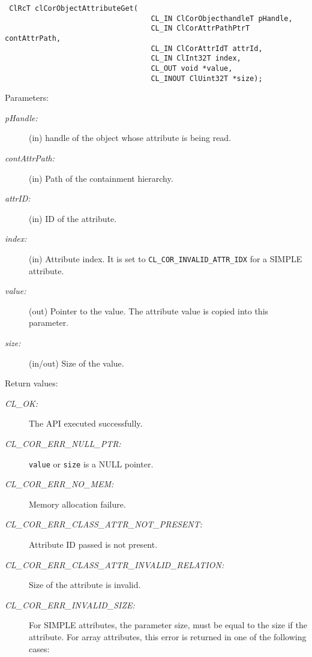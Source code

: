 \begin{flushleft}
\begin{Desc}
\footnotesize\begin{verbatim} ClRcT clCorObjectAttributeGet(
                                  CL_IN ClCorObjecthandleT pHandle,
                                  CL_IN ClCorAttrPathPtrT contAttrPath,
                                  CL_IN ClCorAttrIdT attrId,
                                  CL_IN ClInt32T index,
                                  CL_OUT void *value,
                                  CL_INOUT ClUint32T *size);
\end{verbatim}
\normalsize
\end{Desc}
\begin{Desc}
\item[Parameters:]
\begin{description}
\item[{\em p\-Handle:}](in) handle of the object whose attribute is being read. 
\item[{\em cont\-Attr\-Path:}](in) Path of the containment hierarchy. 
\item[{\em attr\-ID:}](in) ID of the attribute. 
\item[{\em index:}](in) Attribute index. It is set to {\tt{CL\_\-COR\_\-INVALID\_\-ATTR\_\-IDX}} for a SIMPLE attribute. 
\item[{\em value:}] (out) Pointer to the value. The attribute value is copied into this parameter.
\item[{\em size:}] (in/out) Size of the value.\end{description}
\end{Desc}
\begin{Desc}
\item[Return values:]
\begin{description}
\item[{\em CL\_\-OK:}]The API executed successfully. 
\item[{\em CL\_\-COR\_\-ERR\_\-NULL\_\-PTR:}]{\tt{value}} or {\tt{size}} is a NULL pointer. 
\item[{\em CL\_\-COR\_\-ERR\_\-NO\_\-MEM:}]Memory allocation failure. 
\item[{\em CL\_\-COR\_\-ERR\_\-CLASS\_\-ATTR\_\-NOT\_\-PRESENT:}]Attribute ID passed is not present. 
\item[{\em CL\_\-COR\_\-ERR\_\-CLASS\_\-ATTR\_\-INVALID\_\-RELATION:}]Size of the attribute is invalid.
\item[{\em CL\_\-COR\_\-ERR\_\-INVALID\_\-SIZE:}]For SIMPLE attributes, the parameter size, must be equal to the size if the 
attribute. For array attributes, this error is returned in one of the following cases:

\end{description}
\end{Desc}
\end{flushleft}
